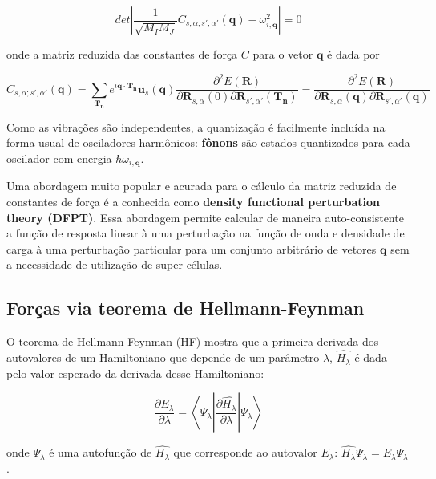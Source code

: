 	\begin{equation}
		det\left| \frac{1}{\sqrt{M_IM_J}}C_{s, \alpha; s', \alpha'}(\mathbf{q}) - \omega_{i, \mathbf{q}}^2 \right| = 0
	\end{equation}
	
	onde a matriz reduzida das constantes de força $C$ para o vetor $\mathbf{q}$ é dada por
	
	\begin{equation}
		C_{s, \alpha; s', \alpha'}(\mathbf{q}) = \sum_{\mathbf{T_n}}e^{i\mathbf{q}\cdot\mathbf{T_n}}\mathbf{u}_s(\mathbf{q})  \frac{\partial^2 E(\mathbf{R})}{\partial \mathbf{R}_{s, \alpha}(0)\partial\mathbf{R}_{s', \alpha'}(\mathbf{T_n})} = \frac{\partial^2 E(\mathbf{R})}{\partial \mathbf{R}_{s, \alpha}(\mathbf{q})\partial\mathbf{R}_{s', \alpha'}(\mathbf{q})} 
	\end{equation}
	
	Como as vibrações são independentes, a quantização é facilmente incluída na forma usual de osciladores harmônicos: \textbf{fônons} são estados quantizados para cada oscilador com energia $\hbar \omega_{i, \mathbf{q}}$.
	
	Uma abordagem muito popular e acurada para o cálculo da matriz reduzida de constantes de força é a conhecida como \textbf{density functional perturbation theory (DFPT)}. Essa abordagem permite calcular de maneira auto-consistente a função de resposta linear à uma perturbação na função de onda e densidade de carga à uma perturbação particular para um conjunto arbitrário de vetores $\mathbf{q}$ sem a necessidade de utilização de super-células.  
	
	\subsection{Forças via teorema de Hellmann-Feynman}
		
		O teorema de Hellmann-Feynman (HF) mostra que a primeira derivada dos autovalores de um Hamiltoniano que depende de um parâmetro $\lambda$, $\hat{H_\lambda}$ é dada pelo valor esperado da derivada desse Hamiltoniano:
		
		\begin{equation}
			\frac{\partial E_\lambda}{\partial \lambda} = \left\langle \Psi_{\lambda}\left| \frac{\partial \hat{H_\lambda}}{\partial \lambda}\right|\Psi_{\lambda} \right\rangle
		\end{equation}
		
		onde $\Psi_{\lambda}$ é uma autofunção de $\hat{H_\lambda}$ que corresponde ao autovalor $E_\lambda$: $\hat{H_\lambda}\Psi_{\lambda} = E_\lambda\Psi_{\lambda}$.
		
